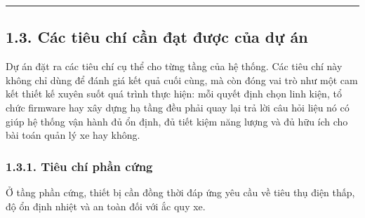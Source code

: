 \documentclass[a4paper]{extarticle}
\begin{document}
\begin{center}\rule{0.5\linewidth}{0.5pt}\end{center}

\subsection{1.3. Các tiêu chí cần đạt được của dự
án}\label{13-cuxe1c-tiuxeau-chuxed-cux1ea7n-ux111ux1ea1t-ux111ux1b0ux1ee3c-cux1ee7a-dux1ef1-uxe1n}

Dự án đặt ra các tiêu chí cụ thể cho từng tầng của hệ
thống. Các tiêu chí này không chỉ dùng để đánh giá kết quả cuối cùng, mà
còn đóng vai trò như một cam kết thiết kế xuyên suốt quá trình thực hiện:
mỗi quyết định chọn linh kiện, tổ chức firmware hay xây dựng hạ tầng đều
phải quay lại trả lời câu hỏi liệu nó có giúp hệ thống vận hành đủ ổn
định, đủ tiết kiệm năng lượng và đủ hữu ích cho bài toán quản lý xe hay
không.

\subsubsection{1.3.1. Tiêu chí phần
cứng}\label{131-tiuxeau-chuxed-phux1ea7n-cux1ee9ng}

Ở tầng phần cứng, thiết bị cần đồng thời đáp ứng yêu cầu về tiêu thụ điện
thấp, độ ổn định nhiệt và an toàn đối với ắc quy xe.
\end{document}
